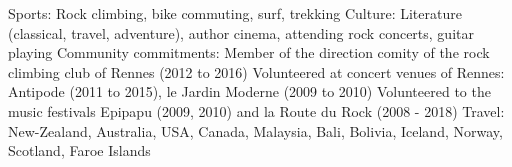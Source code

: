 \begin{cvskills}
  \cvskill
    {Sports:}
	{Rock climbing, bike commuting, surf, trekking}
  \cvskill
    {Culture:}
	{
        Literature (classical, travel, adventure), author cinema, attending rock
        concerts, guitar playing
	}
  \cvskill
    {Community commitments:}
	{
        Member of the direction comity of the rock climbing club of Rennes
        (2012 to 2016)\newline
        Volunteered at concert venues of Rennes: Antipode (2011 to 2015), le
        Jardin Moderne (2009 to 2010)\newline
        Volunteered to the music festivals Epipapu (2009, 2010) and la Route du
        Rock (2008 - 2018)
    }
  \cvskill
    {Travel:}
    {New-Zealand, Australia, USA, Canada, Malaysia, Bali, Bolivia, Iceland,
    Norway, Scotland, Faroe Islands}
\end{cvskills}
